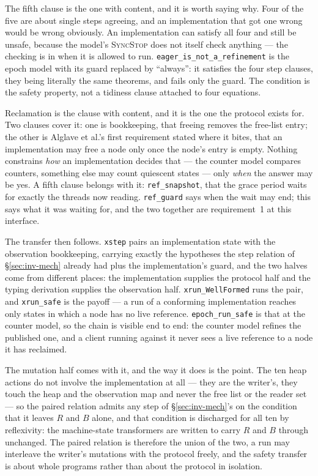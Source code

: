 The fifth clause is the one with content, and it is worth saying why.  Four of
the five are about single steps agreeing, and an implementation that got one
wrong would be wrong obviously.  An implementation can satisfy all four and
still be unsafe, because the model's \textsc{SyncStop} does not itself check
anything --- the checking is in when it is allowed to run.
\texttt{eager\_is\_not\_a\_refinement} is the epoch model with its guard
replaced by ``always'': it satisfies the four step clauses, they being literally
the same theorems, and fails only the guard.  The condition is the safety
property, not a tidiness clause attached to four equations.

Reclamation is the clause with content, and it is the one the protocol exists
for.  Two clauses cover it: one is bookkeeping, that freeing removes the
free-list entry; the other is Alglave et al.'s first requirement stated where it
bites, that an implementation may free a node only once the node's entry is
empty.  Nothing constrains \emph{how} an implementation decides that --- the
counter model compares counters, something else may count quiescent states ---
only \emph{when} the answer may be yes.  A fifth clause belongs with it:
\texttt{ref\_snapshot}, that the grace period waits for exactly the threads now
reading.  \texttt{ref\_guard} says when the wait may end; this says what it was
waiting for, and the two together are requirement~1 at this interface.

The transfer then follows.  \texttt{xstep} pairs an implementation state with
the observation bookkeeping, carrying exactly the hypotheses the step relation
of \S\ref{sec:inv-mech} already had plus the implementation's guard, and the
two halves come from different places: the implementation supplies the protocol
half and the typing derivation supplies the observation half.
\texttt{xrun\_WellFormed} runs the pair, and \texttt{xrun\_safe} is the
payoff --- a run of a conforming implementation reaches only states in which a
\frbl{} node has no live reference.  \texttt{epoch\_run\_safe} is that at the
counter model, so the chain is visible end to end: the counter model refines the
published one, and a client running against it never sees a live reference to a
node it has reclaimed.

The mutation half comes with it, and the way it does is the point.  The ten
heap actions do not involve the implementation at all --- they are the writer's,
they touch the heap and the observation map and never the free list or the
reader set --- so the paired relation admits any step of
\S\ref{sec:inv-mech}'s on the condition that it leaves $R$ and $B$ alone, and
that condition is discharged for all ten by reflexivity: the machine-state
transformers are written to carry $R$ and $B$ through unchanged.  The paired
relation is therefore the union of the two, a run may interleave the writer's
mutations with the protocol freely, and the safety transfer is about whole
programs rather than about the protocol in isolation.

